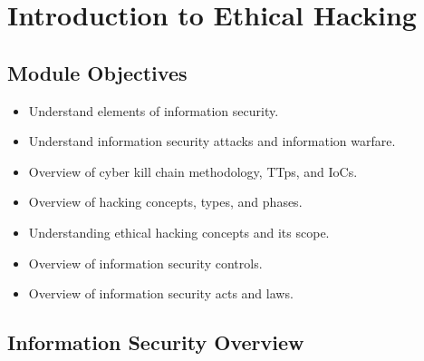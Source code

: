 \section{Introduction to Ethical Hacking}
\subsection{Module Objectives}
\begin{itemize}
    \item Understand elements of information security.
    \item Understand information security attacks and information warfare.
    \item Overview of cyber kill chain methodology, TTps, and IoCs.
    \item Overview of hacking concepts, types, and phases.
    \item Understanding ethical hacking concepts and its scope.
    \item Overview of information security controls.
    \item Overview of information security acts and laws.
\end{itemize}

\subsection{Information Security Overview}

